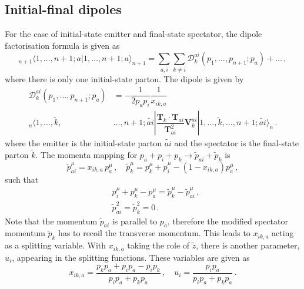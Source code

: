 \documentclass[main.tex]{subfiles}
\begin{document}
    \subsection{Initial-final dipoles}
        For the case of initial-state emitter and final-state spectator,
        the dipole factorisation formula is given as
        \begin{equation}\label{eqn:IF_factorisation}
            {}_{n+1} \langle 1, \ldots, n+1; a | 1, \ldots, n+1; a \rangle_{n+1} = \sum_{a,i}\sum_{k \neq i}\mathcal{D}_{k}^{ai}(p_{1},\ldots,p_{n+1};p_{a}) + \ldots \, ,
        \end{equation}
        where there is only one initial-state parton. The dipole is given by
        \begin{equation}\label{eqn:D_aik}
            \begin{split}
            \mathcal{D}_{k}^{ai}(p_{1}, \ldots, p_{n+1};p_{a}) &= -\dfrac{1}{2p_{a}p_{i}}\dfrac{1}{x_{ik,a}} \\
            {}_{n}\langle 1, \ldots, \tilde{k}, &\ldots, n+1 ; \widetilde{ai} | \dfrac{\boldsymbol{T}_{k} \cdot \boldsymbol{T}_{ai}}{\boldsymbol{T}_{ai}^{2}} \boldsymbol{V}_{k}^{ai} | 1, \ldots, \tilde{k}, \ldots, n+1; \widetilde{ai} \rangle_{n} \, .
            \end{split}
        \end{equation}
        where the emitter is the initial-state parton $\widetilde{ai}$
        and the spectator is the final-state parton $\tilde{k}$.
        The momenta mapping for $p_{a} + p_{i} + p_{k} \rightarrow \tilde{p}_{ai} + \tilde{p}_{k}$ is
        \begin{equation}\label{eqn:IF_mapping}
            \tilde{p}_{ai}^{\mu} = x_{ik,a} \, p_{a}^{\mu} \, , \quad \tilde{p}_{k}^{\mu} = p_{k}^{\mu} + p_{i}^{\mu} - (1-x_{ik,a})p_{a}^{\mu} \, ,
        \end{equation}
        such that
        \begin{equation}\label{eqn:IF_mapping_conditions}
            \begin{split}
            &p_{i}^{\mu} + p_{k}^{\mu} - p_{a}^{\mu} = \tilde{p}_{k}^{\mu} - \tilde{p}_{ai}^{\mu} \, , \\
            &\tilde{p}_{ai}^{2} = \tilde{p}_{k}^{2} = 0 \, .
            \end{split}
        \end{equation}
        Note that the momentum $\tilde{p}_{ai}$ is parallel
        to $p_{a}$, therefore the modified spectator momentum $\tilde{p}_{k}$
        has to recoil the transverse momentum. This leads to $x_{ik,a}$
        acting as a splitting variable.
        With $x_{ik,a}$ taking the role of $\tilde{z}$, there is another
        parameter, $u_{i}$, appearing in the splitting functions.
        These variables are given as
        \begin{equation}\label{eqn:x_ika}
            x_{ik,a} = \dfrac{p_{k}p_{a}+p_{i}p_{a}-p_{i}p_{k}}{p_{i}p_{a} + p_{k}p_{a}} \, , \quad u_{i} = \dfrac{p_{i}p_{a}}{p_{i}p_{a} + p_{k}p_{a}} \, .
        \end{equation}
\end{document}
